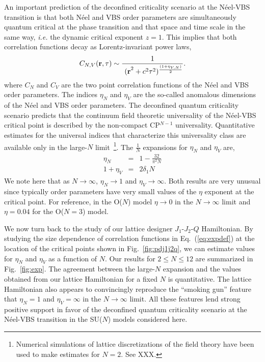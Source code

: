 \documentclass[range]{ar2e}
\begin{document}
An important prediction of the deconfined criticality scenario at the
N\'eel-VBS transition is that both N\'eel and VBS order parameters are
simultaneously quantum critical at the phase transition and that space
and time scale in the same way, {\em i.e.} the dynamic critical exponent $z=1$. This implies
that both correlation functions decay as Lorentz-invariant power laws,
\begin{equation}
\label{eq:expdef}
C_{N,V} ({\bf r},\tau) \sim  \frac{1}{~{(\bf r}^2+c^2\tau^2)^{\frac{(1+\eta_{V,N})}{2}}}.
\end{equation}
 where $C_N$ and $C_V$ are the two point correlation functions of the
 N\'eel and VBS order parameters. The indices $\eta_N$ and $\eta_V$
 are the so-called anomalous dimensions of the N\'eel and VBS order
 parameters. The deconfined quantum criticality scenario predicts that
 the continuum field theoretic universality of the N\'eel-VBS critical
 point is described by the non-compact CP$^{N-1}$ universality. Quantitative
 estimates for the universal indices that characterize this
 universality class are available only in the large-$N$
 limit~\footnote{Numerical simulations of lattice discretizations of
   the field theory have been used to make estimates for $N=2$. See
   XXX.}. The $\frac{1}{N}$ expansions for $\eta_N$ and $\eta_V$ are,
\begin{eqnarray}
\label{eq:oneonN}
\eta_N &=& 1 - \frac{32}{\pi^2N}\nonumber\\
1+\eta_V &=& 2 \delta_1 N
\end{eqnarray}
We note here that as $N\rightarrow\infty$, $\eta_N \rightarrow 1$ and
$\eta_V\rightarrow \infty$. Both results are very unusual since
typically order parameters have very small values of the $\eta$
exponent at the critical point. For reference, in the O($N$) model $\eta\rightarrow
0$ in the $N\rightarrow\infty$ limit and $\eta=0.04$ for the O($N=3$) model.

We now turn back to the study of our lattice designer $J_1$-$J_2$-$Q$
Hamiltonian. By studying the size dependence of correlation functions in Eq.~(\ref{eq:expdef})
 at the location of the critical points shown in Fig.~\ref{fig:pdj1j2q}, we can
 estimate values for $\eta_N$ and $\eta_V$ as a function
 of $N$. Our results for $2\leq N \leq 12$ are summarized in Fig.~\ref{fig:exp}. The
 agreement between the large-$N$ expansion and the values obtained from our
 lattice Hamiltonian for a fixed $N$ is quantitative. The lattice
 Hamiltonian also appears to convincingly reproduce the ``smoking gun'' feature that
 $\eta_N=1$ and $\eta_V=\infty$ in the $N\rightarrow \infty$
 limit. All these features lend strong positive support in favor of
 the deconfined quantum criticality scenario at the N\'eel-VBS
 transition in the SU($N$) models considered here.
\end{document}
